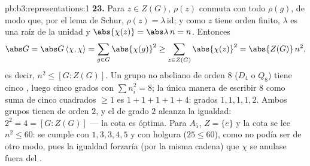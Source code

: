 \begin{solution}{pb:b3:representations:1}
\textbf{23.} Para $z \in Z(G)$, $\rho(z)$ conmuta con todo $\rho(g)$, de
modo que, por el lema de Schur, $\rho(z) = \lambda\,
\mathrm{id}$; y como $z$ tiene orden finito, $\lambda$ es una raíz de la
unidad y $\abs{\chi(z)} = \abs\lambda\,n = n$. Entonces
\[
\abs G = \abs G\,\langle\chi, \chi\rangle
= \sum_{g \in G}\abs{\chi(g)}^2
\geq \sum_{z \in Z(G)}\abs{\chi(z)}^2
= \abs{Z(G)}\,n^2,
\]
es decir, $n^2 \leq [G : Z(G)]$. Un grupo no abeliano de orden $8$
($D_4$ o $Q_8$) tiene cinco , luego cinco grados
 con $\sum n_i^2 = 8$;
la única manera de escribir $8$ como suma de cinco cuadrados $\geq 1$ es
$1 + 1 + 1 + 1
+ 4$: grados $1, 1, 1, 1, 2$. Ambos grupos tienen
 de orden $2$, y el
 de grado $2$ alcanza
la igualdad: $2^2 = 4 = [G : Z(G)]$ --- la cota es óptima. Para $A_5$,
$Z = \{e\}$ y la cota se lee $n^2 \leq 60$: se cumple con
$1, 3, 3, 4, 5$ y con holgura ($25 \leq 60$), como no podía ser de otro
modo, pues la igualdad forzaría (por la misma cadena) que $\chi$ se
anulase fuera del .


\end{solution}
